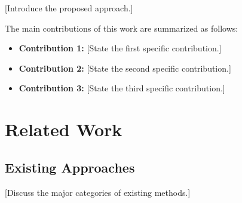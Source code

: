 \documentclass[conference]{IEEEtran}
\begin{document}
[Introduce the proposed approach.]



The main contributions of this work are summarized as follows:

\begin{itemize}

    \item \textbf{Contribution 1:}
    [State the first specific contribution.]

    \item \textbf{Contribution 2:}
    [State the second specific contribution.]

    \item \textbf{Contribution 3:}
    [State the third specific contribution.]

\end{itemize}

%



\section{Related Work}

%
%
%
%
%

\subsection{Existing Approaches}

[Discuss the major categories of existing methods.]
\end{document}
